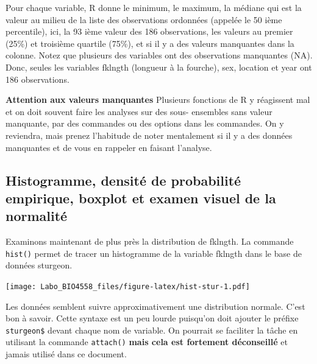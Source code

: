 \documentclass[12pt,]{book}
\makeatletter
\newenvironment{Shaded}{\begin{snugshade}}{\end{snugshade}}
\newcommand{\KeywordTok}[1]{\textcolor[rgb]{0.27,0.27,0.27}{\textbf{#1}}}
\newcommand{\NormalTok}[1]{#1}
\newcommand{\OperatorTok}[1]{\textcolor[rgb]{0.43,0.43,0.43}{\textbf{#1}}}
\newenvironment{kframe}{%
\medskip{}
\setlength{\fboxsep}{.8em}
 \def\at@end@of@kframe{}%
 \ifinner\ifhmode%
  \def\at@end@of@kframe{\end{minipage}}%
  \begin{minipage}{\columnwidth}%
 \fi\fi%
 \def\FrameCommand##1{\hskip\@totalleftmargin \hskip-\fboxsep
 \colorbox{shadecolor}{##1}\hskip-\fboxsep
     \hskip-\linewidth \hskip-\@totalleftmargin \hskip\columnwidth}%
 \MakeFramed {\advance\hsize-\width
   \@totalleftmargin\z@ \linewidth\hsize
   \@setminipage}}%
 {\par\unskip\endMakeFramed%
 \at@end@of@kframe}
\newenvironment{rmdblock}[1]
  {
  \begin{itemize}
  \renewcommand{\labelitemi}{
    \raisebox{-.7\height}[0pt][0pt]{
      {\setkeys{Gin}{width=3em,keepaspectratio}\texttt{[image: images/\#1]}}
    }
  }
  \setlength{\fboxsep}{1em}
  \begin{kframe}
  \item
  }
  {
  \end{kframe}
  \end{itemize}
  }
\newenvironment{rmdwarning}
  {\begin{rmdblock}{warning}}
  {\end{rmdblock}}
\makeatother
\begin{document}
Pour chaque variable, R donne le minimum, le maximum, la médiane qui est la valeur au milieu de la liste des observations ordonnées (appelée le 50 ième percentile), ici, la 93 ième valeur des 186 observations, les valeurs au premier (25\%) et troisième quartile (75\%), et si il y a des valeurs manquantes dans la colonne.
Notez que plusieurs des variables ont des observations manquantes (NA).
Donc, seules les variables fklngth (longueur à la fourche), sex, location et year ont 186 observations.

\begin{rmdwarning}
\textbf{Attention aux valeurs manquantes}
Plusieurs fonctions de R y réagissent mal et on doit souvent faire les analyses sur des sous- ensembles sans valeur manquante, par des commandes ou des options dans les commandes.
On y reviendra, mais prenez l'habitude de noter mentalement si il y a des données manquantes et de vous en rappeler en faisant l'analyse.
\end{rmdwarning}

\hypertarget{histogramme-densituxe9-de-probabilituxe9-empirique-boxplot-et-examen-visuel-de-la-normalituxe9}{%
\subsection{Histogramme, densité de probabilité empirique, boxplot et examen visuel de la normalité}\label{histogramme-densituxe9-de-probabilituxe9-empirique-boxplot-et-examen-visuel-de-la-normalituxe9}}

Examinons maintenant de plus près la distribution de fklngth.
La commande \texttt{hist()} permet de tracer un histogramme de la variable fklngth dans le base de données sturgeon.

\begin{Shaded}
\end{Shaded}

\texttt{[image: Labo\_BIO4558\_files/figure-latex/hist-stur-1.pdf]}

Les données semblent suivre approximativement une distribution normale.
C'est bon à savoir.
Cette syntaxe est un peu lourde puisqu'on doit ajouter le préfixe \texttt{sturgeon\$} devant chaque nom de variable.
On pourrait se faciliter la tâche en utilisant la commande \texttt{attach()} \textbf{mais cela est fortement déconseillé} et jamais utilisé dans ce document.
\end{document}
